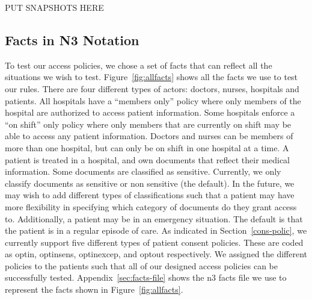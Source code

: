 \documentclass[conference]{IEEEtran}
\begin{document}
PUT SNAPSHOTS HERE

\subsection{Facts in N3 Notation}

To test our access policies, we chose a set of facts that can reflect all the situations we wish to test. Figure~\ref{fig:allfacts} shows all the facts we use
to test our rules. There are four different types of actors: doctors, nurses, hospitals and patients. All hospitals have a ``members only'' policy where only
members of the hospital are authorized to access patient information. Some hospitals enforce a ``on shift'' only policy where only members that are currently on
shift may be able to access any patient information. Doctors and nurses can be members of more than one hospital, but can only be on shift in one hospital at a
time. A patient is treated in a hospital, and own documents that reflect their medical information. Some documents are classified as sensitive. Currently, we
only classify documents as sensitive or non sensitive (the default). In the future, we may wish to add different types of classifications such that a patient
may have more flexibility in specifying which category of documents do they grant access to. Additionally, a patient may be in an emergency situation. The
default is that the patient is in a regular episode of care. As indicated in Section~\ref{cons-polic}, we currently support five different types of patient
consent policies. These are coded as optin, optinsens, optinexcep, and optout respectively. We assigned the different policies to the patients such that all of
our designed access policies can be successfully tested. 
Appendix~\ref{sec:facts-file} shows the n3 facts file we use to represent the facts shown in Figure~\ref{fig:allfacts}.
\end{document}
